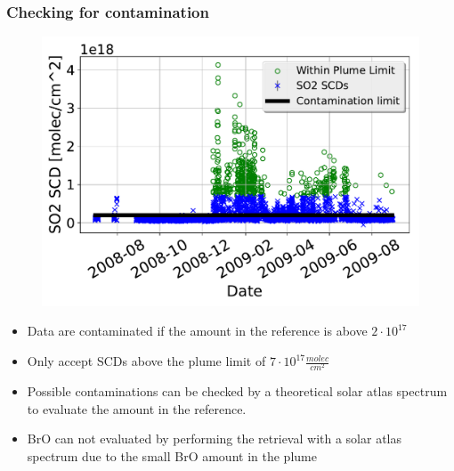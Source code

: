 \documentclass[aspectratio=169]{beamer} %
\begin{document}
\begin{frame}
\begin{multicols}{2}
\begin{figure}
				\label{fig:dddd}
			\end{figure}	
		\end{multicols}
		\end{frame}


			

		\begin{frame}
			\frametitle{\color{mygreen} Checking for contamination\\%
				\color{mygreen}{\rule{0.8\textwidth}{2pt}}}
			\vspace{-0.2cm}
			\begin{multicols}{2}	
				\vspace{-0.5cm}
			\begin{figure}
				\centering
				\includegraphics[width=0.9\linewidth]{../../Bilder/tung_so2_sametime_conbased}
				\label{fig:tungso2sametimeconbased}
			\end{figure}	
		\vspace{-0.5cm}	
				\begin{itemize}
					\item Data are contaminated if the  amount in the reference is above $2\cdot 10^{17}$ 
					\item Only accept  SCDs above the plume limit of $7\cdot 10^{17} \frac{molec}{cm^2}$
				\end{itemize}

		\begin{itemize}
			\item  Possible contaminations can be checked
			by a theoretical solar atlas spectrum to evaluate the  amount in the reference.
			\item BrO can not evaluated by performing the retrieval with a solar atlas spectrum due to the small BrO amount in the plume
		\end{itemize}
			\end{multicols}
		\end{frame}
		
\end{document}
